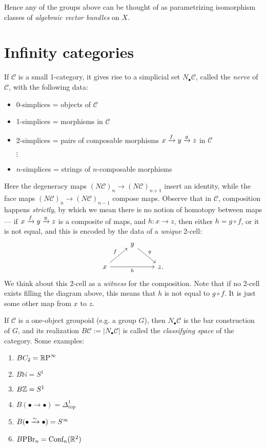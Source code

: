 \documentclass[11pt]{amsart}
\begin{document}
Hence any of the groups above can be thought of as parametrizing isomorphism classes of \textit{algebraic vector bundles} on $X$.





\section{Infinity categories}

\begin{example} If $\mathscr{C}$ is a small 1-category, it gives rise to a simplicial set $N_\bullet \mathscr{C}$, called the \textit{nerve} of $\mathscr{C}$, with the following data:
\begin{itemize}
    \item 0-simplices = objects of $\mathscr{C}$
    \item 1-simplices = morphisms in $\mathscr{C}$
    \item 2-simplices = pairs of composable morphisms $x \xrightarrow{f} y \xrightarrow{g} z$ in $\mathscr{C}$
    \item[$\vdots$]
    \item $n$-simplices = strings of $n$-composable morphisms
\end{itemize}
Here the degeneracy maps $(N\mathscr{C})_n \to (N\mathscr{C})_{n+1}$ insert an identity, while the face maps $(N\mathscr{C})_n \to (N\mathscr{C})_{n-1}$ compose maps. Observe that in $\mathscr{C}$, composition happens \textit{strictly}, by which we mean there is no notion of homotopy between maps --- if $x \xrightarrow{f} y \xrightarrow{g} z$ is a composite of maps, and $h \colon x \to z$, then either $h = g\circ f$, or it is not equal, and this is encoded by the data of a \textit{unique} 2-cell:
\[ \begin{tikzcd}
     & y\ar[dr,"g" above right]\\
    x\ar[ur,"f" above left]\ar[rr,"h" below] &  & z.
\end{tikzcd} \]
We think about this 2-cell as a \textit{witness} for the composition. Note that if no 2-cell exists filling the diagram above, this means that $h$ is not equal to $g\circ f$. It is just some other map from $x$ to $z$.
\end{example}

\begin{example} If $\mathscr{C}$ is a one-object groupoid (e.g. a group $G$), then $N_\bullet \mathscr{C}$ is the bar construction of $G$, and its realization $B \mathscr{C} := |N_\bullet \mathscr{C}|$ is called the \textit{classifying space} of the category. Some examples:
\begin{enumerate}
    \item $BC_2 = {\mathbb{R}\text{P}}^\infty$
    \item $B \mathbb{N} = S^1$
    \item $B\mathbb{Z} = S^1$
    \item $B (\bullet \to \bullet) = \Delta^1_\text{top}$
    \item $B (\bullet \xrightarrow{\sim} \bullet) = S^\infty$
    \item $B\text{PBr}_n = \text{Conf}_n(\mathbb{R}^2)$
\end{enumerate}
\end{example}
\end{document}
